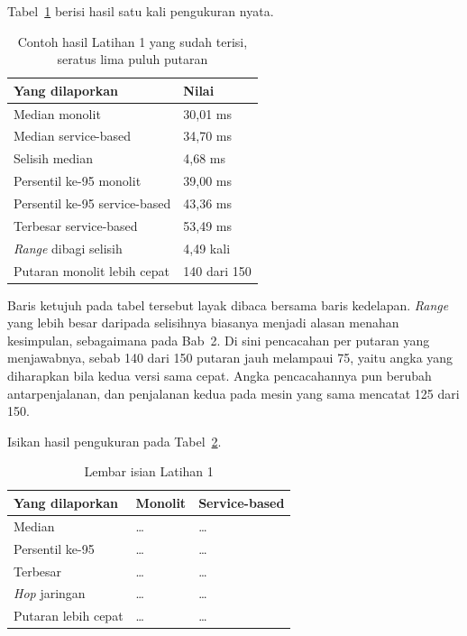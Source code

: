 Tabel~\ref{tab:lat1layanan-contoh} berisi hasil satu kali pengukuran nyata.

\begin{table}[htbp]
  \centering
  \caption{Contoh hasil Latihan 1 yang sudah terisi, seratus lima puluh
    putaran}
  \label{tab:lat1layanan-contoh}
  \begin{tabularx}{\textwidth}{|X|l|}
    \hline
    \textbf{Yang dilaporkan} & \textbf{Nilai} \\
    \hline
    Median monolit & 30,01 ms \\
    \hline
    Median service-based & 34,70 ms \\
    \hline
    Selisih median & 4,68 ms \\
    \hline
    Persentil ke-95 monolit & 39,00 ms \\
    \hline
    Persentil ke-95 service-based & 43,36 ms \\
    \hline
    Terbesar service-based & 53,49 ms \\
    \hline
    \textit{Range} dibagi selisih & 4,49 kali \\
    \hline
    Putaran monolit lebih cepat & 140 dari 150 \\
    \hline
  \end{tabularx}
\end{table}

Baris ketujuh pada tabel tersebut layak dibaca bersama baris kedelapan.
\textit{Range} yang lebih besar daripada selisihnya biasanya menjadi alasan
menahan kesimpulan, sebagaimana pada Bab~2. Di sini pencacahan per putaran
yang menjawabnya, sebab 140 dari 150 putaran jauh melampaui 75, yaitu angka
yang diharapkan bila kedua versi sama cepat. Angka pencacahannya pun berubah
antarpenjalanan, dan penjalanan kedua pada mesin yang sama mencatat 125 dari
150.

Isikan hasil pengukuran pada Tabel~\ref{tab:lat1layanan-hasil}.

\begin{table}[htbp]
  \centering
  \caption{Lembar isian Latihan 1}
  \label{tab:lat1layanan-hasil}
  \begin{tabularx}{\textwidth}{|X|l|l|}
    \hline
    \textbf{Yang dilaporkan} & \textbf{Monolit} & \textbf{Service-based} \\
    \hline
    Median & \dots & \dots \\
    \hline
    Persentil ke-95 & \dots & \dots \\
    \hline
    Terbesar & \dots & \dots \\
    \hline
    \textit{Hop} jaringan & \dots & \dots \\
    \hline
    Putaran lebih cepat & \dots & \dots \\
    \hline
  \end{tabularx}
\end{table}


